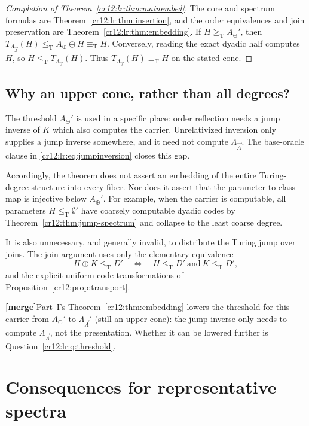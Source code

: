 \documentclass[11pt,letterpaper]{article}
\theoremstyle{plain}
\theoremstyle{definition}
\theoremstyle{remark}
\numberwithin{equation}{section}
\newcommand{\leT}{\leq_{\mathrm T}}
\newcommand{\geT}{\geq_{\mathrm T}}
\newcommand{\eqT}{\equiv_{\mathrm T}}
\newcommand{\mergenote}[1]{\par\smallskip\noindent
 {\small\textsf{\textbf{[merge]}}\enspace #1}\par\smallskip}
\newcommand{\Aplus}{A_{\oplus}}          %
\newcommand{\Lam}{\Lambda_{\vec A}}      %
\begin{document}
\begin{proof}[Completion of Theorem~\ref{cr12:lr:thm:mainembed}]
The core and spectrum formulas are Theorem~\ref{cr12:lr:thm:insertion}, and the order
equivalences and join preservation are Theorem~\ref{cr12:lr:thm:embedding}. If
$H\geT \Aplus'$, then $T_{\Lam}(H)\leT \Aplus\oplus H\eqT H$. Conversely, reading the
exact dyadic half computes $H$, so $H\leT T_{\Lam}(H)$. Thus $T_{\Lam}(H)\eqT H$ on the
stated cone.
\end{proof}

\subsection{Why an upper cone, rather than all degrees?}
The threshold $\Aplus'$ is used in a specific place: order reflection needs a jump
inverse of $K$ which also computes the carrier. Unrelativized inversion only supplies a
jump inverse somewhere, and it need not compute $\Lam$. The base-oracle clause in
\eqref{cr12:lr:eq:jumpinversion} closes this gap.

Accordingly, the theorem does not assert an embedding of the entire Turing-degree
structure into every fiber. Nor does it assert that the parameter-to-class map is
injective below $\Aplus'$. For example, when the carrier is computable, all parameters
$H\leT\emptyset'$ have coarsely computable dyadic codes by
Theorem~\ref{cr12:thm:jump-spectrum} and collapse to the least coarse degree.

It is also unnecessary, and generally invalid, to distribute the Turing jump over
joins. The join argument uses only the elementary equivalence
\[
 H\oplus K\leT D'\quad\Longleftrightarrow\quad
 H\leT D'\ \text{and}\ K\leT D',
\]
and the explicit uniform code transformations of
Proposition~\ref{cr12:prop:transport}.

\mergenote{Part~I's Theorem~\ref{cr12:thm:embedding} lowers the threshold for this carrier
from $\Aplus'$ to $\Lam'$ (still an upper cone): the jump inverse only needs to compute
$\Lam$, not the presentation. Whether it can be lowered further is
Question~\ref{cr12:lr:q:threshold}.}

\section{Consequences for representative spectra}\label{cr12:lr:sec:consequences}
\end{document}
